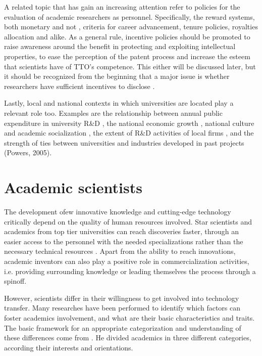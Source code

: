 A related topic that has gain an increasing attention refer to policies for the evaluation of academic researchers as personnel. Specifically, the reward systems, both monetary and not \citep{Guerrero2014}, criteria for career advancement, tenure policies, royalties allocation and alike. As a general rule, incentive policies should be promoted to raise awareness around the benefit in protecting and exploiting intellectual properties, to ease the perception of the patent process and increase the esteem that scientists have of TTO's competence. This either will be discussed later, but it should be recognized from the beginning that a major issue is whether researchers have sufficient incentives to disclose \citep{Debackere2005}.

Lastly, local and national contexts in which universities are located play a relevant role too. Examples are the relationship between annual public expenditure in university R\&D \citep{OShea2005}, the national economic growth \citep{Siegel2003a}, national culture and academic socialization \citep{Bercovitz2006}, the extent of R\&D activities of local firms \citep{Siegel2003a}, and the strength of ties between universities and industries developed in past projects (Powers, 2005). 

\section{Academic scientists}

The development ofew innovative knowledge and cutting-edge technology critically depend on the quality of human resources involved. Star scientists and academics from top tier universities can reach discoveries faster, through an easier access to the personnel with the needed specializations rather than the necessary technical resources \citep{OShea2005}. Apart from the ability to reach innovations, academic inventors can also play a positive role in commercialization activities, i.e. providing surrounding knowledge or leading themselves the process through a spinoff.

However, scientists differ in their willingness to get involved into technology transfer. Many researches have been performed to identify which factors can foster academics involvement, and what are their basic characteristics and traits. The basic framework for an appropriate categorization and understanding of these differences come from \citet{Stokes1997}. He divided academics in three different categories, according their interests and orientations. 

